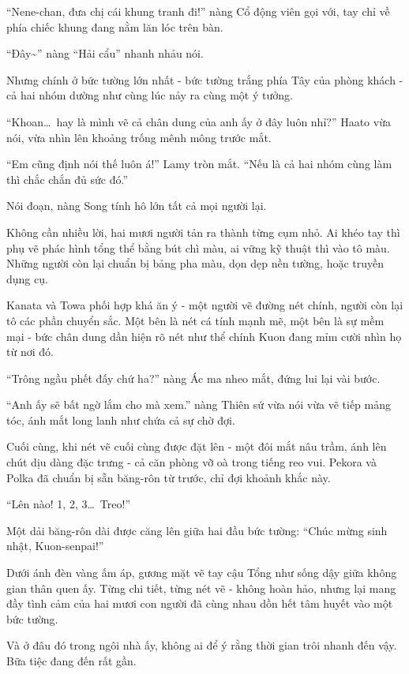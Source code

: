 \documentclass[../main.tex]{subfiles}
\begin{document}
``Nene-chan, đưa chị cái khung tranh đi!'' nàng Cổ động viên gọi với, tay chỉ về phía chiếc khung đang nằm lăn lóc trên bàn.

``Đây\~{}'' nàng ``Hải cẩu'' nhanh nhảu nói.

Nhưng chính ở bức tường lớn nhất - bức tường trắng phía Tây của phòng khách - cả hai nhóm dường như cùng lúc nảy ra cùng một ý tưởng.

``Khoan\dots\ hay là mình vẽ cả chân dung của anh ấy ở đây luôn nhỉ?'' Haato vừa nói, vừa nhìn lên khoảng trống mênh mông trước mắt.

``Em cũng định nói thế luôn á!'' Lamy tròn mắt. ``{Nếu là cả hai nhóm cùng làm thì chắc chắn đủ sức đó.}''

Nói đoạn, nàng Song tính hô lớn tất cả mọi người lại.

Không cần nhiều lời, hai mươi người tản ra thành từng cụm nhỏ. Ai khéo tay thì phụ vẽ phác hình tổng thể bằng bút chì màu, ai vững kỹ thuật thì vào tô màu. Những người còn lại chuẩn bị bảng pha màu, dọn dẹp nền tường, hoặc truyền dụng cụ.

Kanata và Towa phối hợp khá ăn ý - một người vẽ đường nét chính, người còn lại tô các phần chuyển sắc. Một bên là nét cá tính mạnh mẽ, một bên là sự mềm mại - bức chân dung dần hiện rõ nét như thể chính Kuon đang mỉm cười nhìn họ từ nơi đó.

``Trông ngầu phết đấy chứ ha?'' nàng Ác ma nheo mắt, đứng lui lại vài bước.

``Anh ấy sẽ bất ngờ lắm cho mà xem.'' nàng Thiên sứ vừa nói vừa vẽ tiếp mảng tóc, ánh mắt long lanh như chứa cả sự chờ đợi.

Cuối cùng, khi nét vẽ cuối cùng được đặt lên - một đôi mắt nâu trầm, ánh lên chút dịu dàng đặc trưng - cả căn phòng vỡ oà trong tiếng reo vui. Pekora và Polka đã chuẩn bị sẵn băng-rôn từ trước, chỉ đợi khoảnh khắc này.

``{Lên nào! 1, 2, 3\dots\ Treo!}''

Một dải băng-rôn dài được căng lên giữa hai đầu bức tường: ``Chúc mừng sinh nhật, Kuon-senpai!''

Dưới ánh đèn vàng ấm áp, gương mặt vẽ tay cậu Tổng như sống dậy giữa không gian thân quen ấy. Từng chi tiết, từng nét vẽ - không hoàn hảo, nhưng lại mang đầy tình cảm của hai mươi con người đã cùng nhau dồn hết tâm huyết vào một bức tường.

Và ở đâu đó trong ngôi nhà ấy, không ai để ý rằng thời gian trôi nhanh đến vậy. Bữa tiệc đang đến rất gần.

\ct
\end{document}

